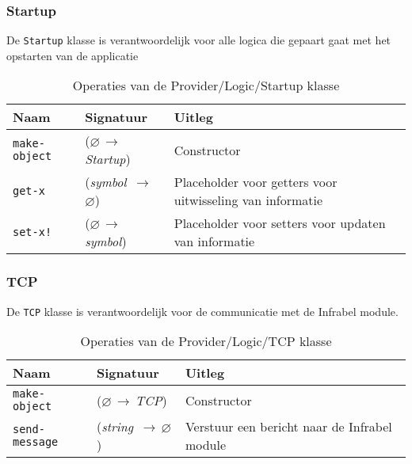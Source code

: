 \documentclass[a4paper, 11pt]{article}
\newcommand{\naar}{\,$\rightarrow$\,}
\renewcommand{\empty}{$\varnothing$}
\newcommand{\<}{\scriptsize\textless\normalsize}
\renewcommand{\>}{\scriptsize\textgreater\normalsize}
\begin{document}
\subsubsection{Startup} %
De \texttt{Startup} klasse is verantwoordelijk voor alle logica die gepaart gaat met het opstarten van de applicatie
\begin{table}[H]
	\begin{center}
		{
			\begin{tabular}{|l l l|}
				\hline
				\textbf{Naam} & \textbf{Signatuur} & \textbf{Uitleg}\\
				\hline
				\texttt{make-object} & (\empty \naar \textit{Startup}) & Constructor\\
				\hline
				\texttt{get-x} & (\textit{symbol} \naar \empty) & Placeholder voor getters voor uitwisseling van informatie\\
				\texttt{set-x!} & (\empty \naar \textit{symbol}) & Placeholder voor setters voor updaten van informatie\\
				\hline
		\end{tabular}}
		\caption{Operaties van de Provider/Logic/Startup klasse}
	\end{center}
\end{table}

\subsubsection{TCP} %
De \texttt{TCP} klasse is verantwoordelijk voor de communicatie met de Infrabel module.
\begin{table}[H]
	\begin{center}
		{
			\begin{tabular}{|l l l|}
				\hline
				\textbf{Naam} & \textbf{Signatuur} & \textbf{Uitleg}\\
				\hline
				\texttt{make-object} & (\empty \naar \textit{TCP}) & Constructor\\
				\hline
				\texttt{send-message} & (\textit{string} \naar \empty) & Verstuur een bericht naar de Infrabel module\\
				\hline
		\end{tabular}}
		\caption{Operaties van de Provider/Logic/TCP klasse}
	\end{center}
\end{table}
\end{document}
